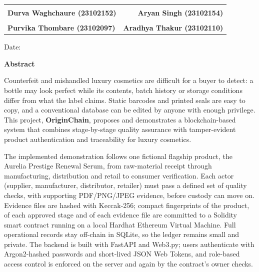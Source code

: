 \documentclass[12pt,a4paper]{report}
\begin{document}
\vspace{1.8cm}
\noindent
\begin{tabular*}{\textwidth}{@{\extracolsep{\fill}}lr}
    \underline{\hspace{5.5cm}} & \underline{\hspace{5.5cm}} \\
    \textbf{Durva Waghchaure (23102152)} & \textbf{Aryan Singh (23102154)} \\[1.8cm]
    \underline{\hspace{5.5cm}} & \underline{\hspace{5.5cm}} \\
    \textbf{Purvika Thombare (23102097)} & \textbf{Aradhya Thakur (23102110)} \\
\end{tabular*}

\vspace{1.5cm}
\noindent Date: \underline{\hspace{3.5cm}}

\newpage
\thispagestyle{plain}
\begin{center}
    {\Large \textbf{Abstract}\par}
\end{center}
\vspace{0.5cm}
Counterfeit and mishandled luxury cosmetics are difficult for a buyer to detect: a bottle may look perfect while its contents, batch history or storage conditions differ from what the label claims. Static barcodes and printed seals are easy to copy, and a conventional database can be edited by anyone with enough privilege. This project, \textbf{OriginChain}, proposes and demonstrates a blockchain-based system that combines stage-by-stage quality assurance with tamper-evident product authentication and traceability for luxury cosmetics.

The implemented demonstration follows one fictional flagship product, the Aurelia Prestige Renewal Serum, from raw-material receipt through manufacturing, distribution and retail to consumer verification. Each actor (supplier, manufacturer, distributor, retailer) must pass a defined set of quality checks, with supporting PDF/PNG/JPEG evidence, before custody can move on. Evidence files are hashed with Keccak-256; compact fingerprints of the product, of each approved stage and of each evidence file are committed to a Solidity smart contract running on a local Hardhat Ethereum Virtual Machine. Full operational records stay off-chain in SQLite, so the ledger remains small and private. The backend is built with FastAPI and Web3.py; users authenticate with Argon2-hashed passwords and short-lived JSON Web Tokens, and role-based access control is enforced on the server and again by the contract's owner checks.
\end{document}

